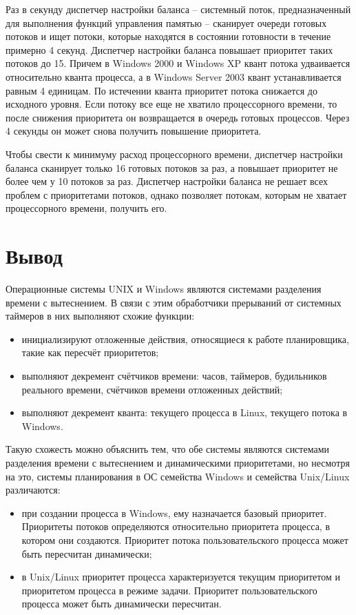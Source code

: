 Раз в секунду диспетчер настройки баланса -- системный поток, предназначенный для выполнения функций управления памятью -- сканирует очереди готовых потоков и ищет потоки, которые находятся в состоянии готовности в течение примерно 4 секунд. Диспетчер настройки баланса повышает приоритет таких потоков до 15. Причем в {\ttfamily Windows 2000} и {\ttfamily Windows XP} квант потока удваивается относительно кванта процесса, а в {\ttfamily Windows Server 2003} квант устанавливается равным 4 единицам. По истечении кванта приоритет потока снижается до исходного уровня. Если потоку все еще не хватило процессорного времени, то после снижения приоритета он возвращается в очередь готовых процессов. Через 4 секунды он может снова получить повышение приоритета.

Чтобы свести к минимуму расход процессорного времени, диспетчер настройки баланса сканирует только 16 готовых потоков за раз, а повышает приоритет не более чем у 10 потоков за раз.
Диспетчер настройки баланса не решает всех проблем с приоритетами потоков, однако позволяет потокам, которым не хватает процессорного времени, получить его.

\chapter*{Вывод}

Операционные системы {\ttfamily UNIX} и {\ttfamily Windows} являются системами разделения времени с вытеснением. В связи с этим обработчики прерываний от системных таймеров в них выполняют схожие функции:
\begin{itemize}
	\item инициализируют отложенные действия, относящиеся к работе планировщика, такие как пересчёт приоритетов;
	\item выполняют декремент счётчиков времени: часов, таймеров, будильников реального времени, счётчиков времени отложенных действий;
	\item выполняют декремент кванта: текущего процесса в {\ttfamily Linux}, текущего потока в {\ttfamily Windows}.
\end{itemize}

Такую схожесть можно объяснить тем, что обе системы являются системами разделения времени с вытеснением и динамическими приоритетами, но несмотря на это, системы планирования в ОС семейства {\ttfamily Windows} и семейства {\ttfamily Unix/Linux} различаются:

\begin{itemize}
	\item при создании процесса в {\ttfamily Windows}, ему назначается базовый приоритет. Приоритеты потоков определяются относительно приоритета процесса, в котором они создаются. Приоритет потока пользовательского процесса может быть пересчитан динамически;
	
	\item в {\ttfamily Unix/Linux} приоритет процесса характеризуется текущим приоритетом и приоритетом процесса в режиме задачи. Приоритет пользовательского процесса может быть динамически пересчитан.
\end{itemize}
